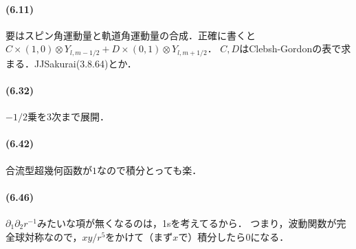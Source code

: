 \paragraph{(6.11)}
要はスピン角運動量と軌道角運動量の合成．正確に書くと$C\times(1, 0)\otimes Y_{l, m - 1/2} + D\times(0, 1)\otimes Y_{l, m + 1/2}$．
$C, D$はClebsh-Gordonの表で求まる．JJSakurai(3.8.64)とか．

\paragraph{(6.32)}
$ - 1/2$乗を3次まで展開．


\paragraph{(6.42)}
合流型超幾何函数が$1$なので積分とっても楽．

\paragraph{(6.46)}
$\partial_1\partial_2 r^{ - 1}$みたいな項が無くなるのは，1sを考えてるから．
つまり，波動関数が完全球対称なので，$xy/r^5$をかけて（まず$x$で）積分したら$0$になる．


